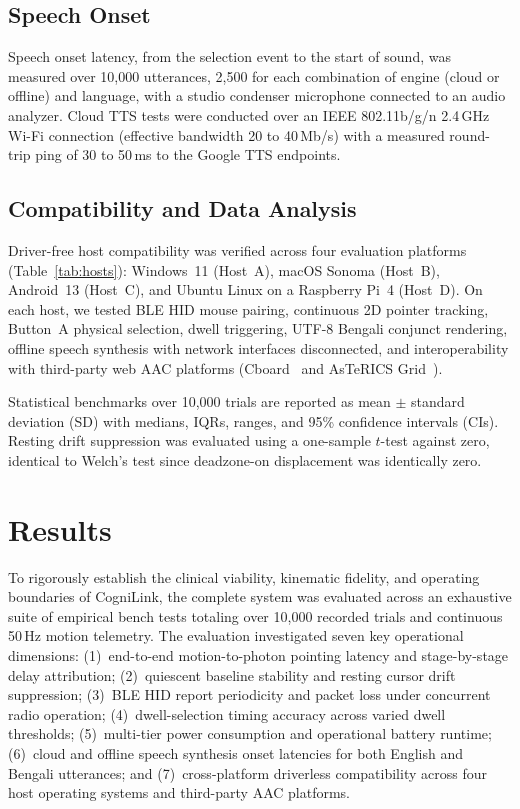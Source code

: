 \documentclass[journal]{IEEEtran}
\begin{document}
\subsection{Speech Onset}
Speech onset latency, from the selection event to the start of sound, was measured over 10,000 utterances, 2,500 for each combination of engine (cloud or offline) and language, with a studio condenser microphone connected to an audio analyzer. Cloud TTS tests were conducted over an IEEE 802.11b/g/n 2.4\,GHz Wi-Fi connection (effective bandwidth 20 to 40\,Mb/s) with a measured round-trip ping of 30 to 50\,ms to the Google TTS endpoints.

\subsection{Compatibility and Data Analysis}
Driver-free host compatibility was verified across four evaluation platforms (Table~\ref{tab:hosts}): Windows~11 (Host~A), macOS Sonoma (Host~B), Android~13 (Host~C), and Ubuntu Linux on a Raspberry Pi~4 (Host~D). On each host, we tested BLE HID mouse pairing, continuous 2D pointer tracking, Button~A physical selection, dwell triggering, UTF-8 Bengali conjunct rendering, offline speech synthesis with network interfaces disconnected, and interoperability with third-party web AAC platforms (Cboard~\cite{cboard} and AsTeRICS Grid~\cite{astericsgrid}).

Statistical benchmarks over 10,000 trials are reported as mean $\pm$ standard deviation (SD) with medians, IQRs, ranges, and 95\% confidence intervals (CIs). Resting drift suppression was evaluated using a one-sample $t$-test against zero, identical to Welch's test since deadzone-on displacement was identically zero.

\section{Results}
\label{sec:results}

To rigorously establish the clinical viability, kinematic fidelity, and operating boundaries of CogniLink, the complete system was evaluated across an exhaustive suite of empirical bench tests totaling over 10,000 recorded trials and continuous 50\,Hz motion telemetry. The evaluation investigated seven key operational dimensions: (1)~end-to-end motion-to-photon pointing latency and stage-by-stage delay attribution; (2)~quiescent baseline stability and resting cursor drift suppression; (3)~BLE HID report periodicity and packet loss under concurrent radio operation; (4)~dwell-selection timing accuracy across varied dwell thresholds; (5)~multi-tier power consumption and operational battery runtime; (6)~cloud and offline speech synthesis onset latencies for both English and Bengali utterances; and (7)~cross-platform driverless compatibility across four host operating systems and third-party AAC platforms.
\end{document}
